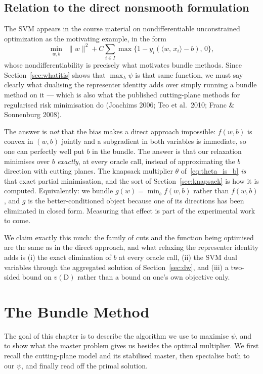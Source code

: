 \documentclass[11pt,a4paper]{report}
\newcommand{\inner}[2]{\langle #1,\, #2 \rangle}
\begin{document}
\section{Relation to the direct nonsmooth formulation}
\label{sec:bmrm}
The SVM appears in the course material on nondifferentiable unconstrained
optimization as the motivating example, in the form
\[
\min_{w,b}\ \ \|w\|^2+C\sum_{i\in I}\max\bigl\{1-y_i(\inner{w}{x_i}-b),\,0\bigr\},
\]
whose nondifferentiability is precisely what motivates bundle methods. Since
Section~\ref{sec:whatitis} shows that $\max_\lambda\psi$ is that same function, we
must say clearly what dualising the representer identity adds over simply running a
bundle method on it --- which is also what the published cutting-plane methods for
regularised risk minimisation do (Joachims 2006; Teo et al.\ 2010; Franc \&
Sonnenburg 2008).

The answer is \emph{not} that the bias makes a direct approach impossible: $f(w,b)$
is convex in $(w,b)$ jointly and a subgradient in both variables is immediate, so one
can perfectly well put $b$ in the bundle. The answer is that our relaxation minimises
over $b$ \emph{exactly}, at every oracle call, instead of approximating the $b$
direction with cutting planes. The knapsack multiplier $\theta$
of~\eqref{eq:theta_is_b} \emph{is} that exact partial minimisation, and the sort of
Section~\ref{sec:knapsack} is how it is computed. Equivalently: we bundle
$g(w)=\min_b f(w,b)$ rather than $f(w,b)$, and $g$ is the better-conditioned object
because one of its directions has been eliminated in closed form. Measuring that
effect is part of the experimental work to come.

We claim exactly this much: the family of cuts and the function being optimised are
the same as in the direct approach, and what relaxing the representer identity adds
is (i) the exact elimination of $b$ at every oracle call, (ii) the SVM dual variables
through the aggregated solution of Section~\ref{sec:dw}, and (iii) a two-sided bound
on $v(\mathrm{D})$ rather than a bound on one's own objective only.

\chapter{The Bundle Method}
\label{ch:bundle}

The goal of this chapter is to describe the algorithm we use to maximise $\psi$, and
to show what the master problem gives us besides the optimal multiplier. We first
recall the cutting-plane model and its stabilised master, then specialise both to
our $\psi$, and finally read off the primal solution.
\end{document}
